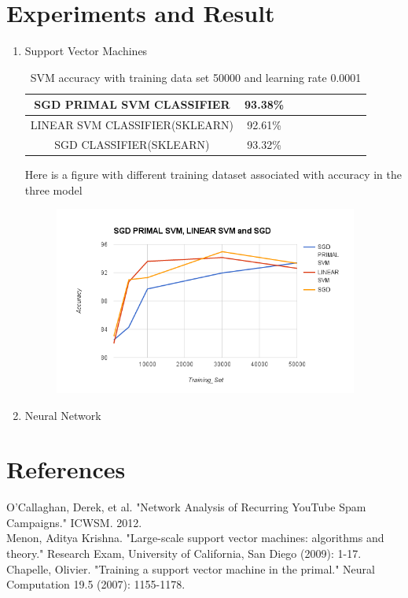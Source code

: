 \documentclass [a4paper, 11pt, oneside, final]{article}
\numberwithin{equation}{section}		%
\numberwithin{figure}{section}			%
\numberwithin{table}{section}				%
\begin{document}
\section{Experiments and Result}
\begin{enumerate}
\item Support Vector Machines \\
\begin{table}[h!]
  \begin{center}
    \caption{SVM accuracy with training data set 50000 and learning rate 0.0001}
    \label{tab:table1}
    \begin{tabular}{ccccccccc}
    \\
    \hline
     SGD PRIMAL SVM CLASSIFIER & 93.38\% \\
      \hline
     LINEAR SVM CLASSIFIER(SKLEARN) & 92.61\% \\
      \hline
     SGD CLASSIFIER(SKLEARN) & 93.32\%  \\
      \hline
    \end{tabular}
  \end{center}
\end{table}

Here is a figure with different training dataset associated with accuracy in the three model
\begin{figure}[h]
\includegraphics[width = 10cm]{svm}
\end{figure}
\item Neural Network \\
\end{enumerate}


\section{References}
\noindent O'Callaghan, Derek, et al. "Network Analysis of Recurring YouTube Spam Campaigns." ICWSM. 2012.\\
\noindent Menon, Aditya Krishna. "Large-scale support vector machines: algorithms and theory." Research Exam, University of California, San Diego (2009): 1-17.\\
\noindent Chapelle, Olivier. "Training a support vector machine in the primal." Neural Computation 19.5 (2007): 1155-1178.\\
\end{document}
